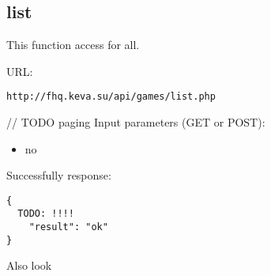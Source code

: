 \subsection{list}
\par

This function access for all.

URL:
\begin{Verbatim}[frame=single]
http://fhq.keva.su/api/games/list.php
\end{Verbatim}

// TODO paging
Input parameters (GET or POST):
\begin{itemize}
  \item no
\end{itemize}

Successfully response:  \\
\begin{Verbatim}[frame=single]
{
  TODO: !!!!
    "result": "ok"
}
\end{Verbatim}



Also look ~

